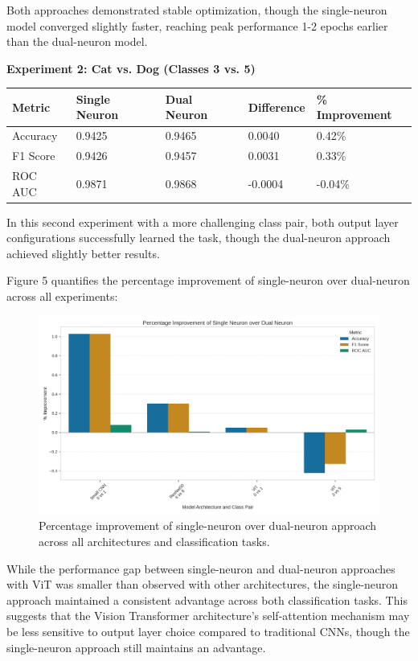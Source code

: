 \documentclass[11pt]{article}
\begin{document}
Both approaches demonstrated stable optimization, though the single-neuron model converged slightly faster, reaching peak performance 1-2 epochs earlier than the dual-neuron model.

\textbf{Experiment 2: Cat vs. Dog (Classes 3 vs. 5)}

\begin{tabular}{lllll}
\hline
Metric & Single Neuron & Dual Neuron & Difference & \% Improvement \\
\hline
Accuracy & 0.9425 & 0.9465 & 0.0040 & 0.42\% \\
F1 Score & 0.9426 & 0.9457 & 0.0031 & 0.33\% \\
ROC AUC & 0.9871 & 0.9868 & -0.0004 & -0.04\% \\
\hline
\end{tabular}

In this second experiment with a more challenging class pair, both output layer configurations successfully learned the task, though the dual-neuron approach achieved slightly better results.

Figure 5 quantifies the percentage improvement of single-neuron over dual-neuron across all experiments:

\begin{figure}[htbp]
\centering
\includegraphics[width=\textwidth]{figures/improvement_percentage.png}
\caption{Percentage improvement of single-neuron over dual-neuron approach across all architectures and classification tasks.}
\end{figure}

While the performance gap between single-neuron and dual-neuron approaches with ViT was smaller than observed with other architectures, the single-neuron approach maintained a consistent advantage across both classification tasks. This suggests that the Vision Transformer architecture's self-attention mechanism may be less sensitive to output layer choice compared to traditional CNNs, though the single-neuron approach still maintains an advantage.
\end{document}
